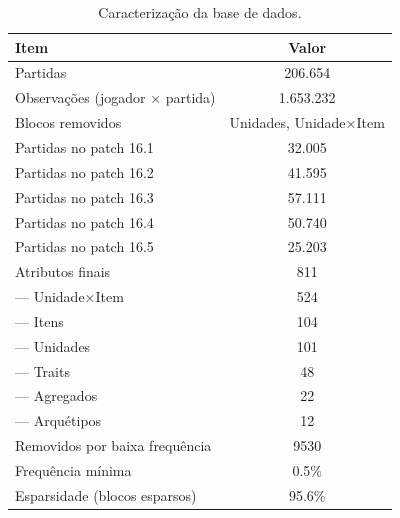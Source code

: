 \begin{table}[htbp]
\caption{Caracterização da base de dados.}
\label{tab:dados}
\centering
\small
\begin{tabular}{lc}
\toprule
Item & Valor \\
\midrule
Partidas & 206.654 \\
Observações (jogador × partida) & 1.653.232 \\
Blocos removidos & Unidades, Unidade×Item \\
  Partidas no patch 16.1 & 32.005 \\
  Partidas no patch 16.2 & 41.595 \\
  Partidas no patch 16.3 & 57.111 \\
  Partidas no patch 16.4 & 50.740 \\
  Partidas no patch 16.5 & 25.203 \\
Atributos finais & 811 \\
  — Unidade×Item & 524 \\
  — Itens & 104 \\
  — Unidades & 101 \\
  — Traits & 48 \\
  — Agregados & 22 \\
  — Arquétipos & 12 \\
Removidos por baixa frequência & 9530 \\
Frequência mínima & 0.5\% \\
Esparsidade (blocos esparsos) & 95.6\% \\
\bottomrule
\end{tabular}
\end{table}
